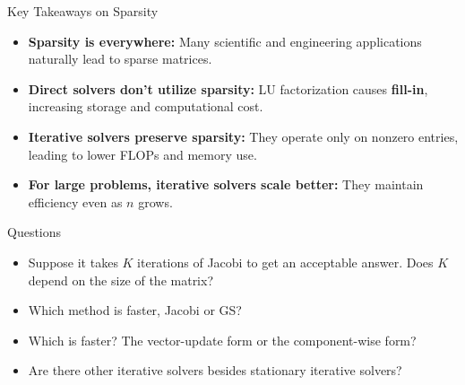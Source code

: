 \documentclass[10pt]{beamer}
\begin{document}
\begin{frame}{Key Takeaways on Sparsity }

\begin{itemize}
    \item \textbf{Sparsity is everywhere:} Many scientific and engineering applications naturally lead to sparse matrices.\\[3mm]
    
    \item \textbf{Direct solvers don't utilize sparsity:} LU factorization causes \textbf{fill-in}, increasing storage and computational cost.\\[3mm]
    
    \item \textbf{Iterative solvers preserve sparsity:} They operate only on nonzero entries, leading to lower FLOPs and memory use.\\[3mm]
    
    \item \textbf{For large problems, iterative solvers scale better:} They maintain efficiency even as \( n \) grows.
\end{itemize}

\end{frame}


\begin{frame}{Questions}

\begin{itemize}
    \item Suppose it takes $K$ iterations of Jacobi to get an acceptable answer. Does $K$ depend on the size of the matrix?
        \vfill 
    \item Which method is faster, Jacobi or GS? 
        \vfill 
    \item Which is faster? The vector-update form or the component-wise form?
        \vfill
    \item Are there other iterative solvers besides stationary iterative solvers?
\end{itemize}

    
\end{frame}
\end{document}
